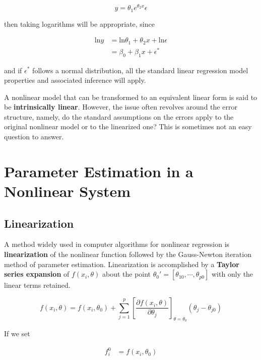 \documentclass[12pt]{article}
\begin{document}
$$
y = \theta_1 e^{\theta_2 x} \epsilon
$$

then taking logarithms will be appropriate, since

$$
\begin{aligned}
\mathrm{ln} y &= \mathrm{ln}\theta_1 + \theta_2 x + \mathrm{ln} \epsilon \\
&= \beta_0 + \beta_1 x + \epsilon^\ast
\end{aligned}
$$

and if $\epsilon^\ast$ follows a normal distribution, all the standard linear regression model properties and associated inference will apply.

A nonlinear model that can be transformed to an equivalent linear form is said to be \textbf{intrinsically linear}. However, the issue often revolves around the error structure, namely, do the standard assumptions on the errors apply to the original nonlinear model or to the linearized one? This is sometimes not an easy question to answer.


\section{Parameter Estimation in a Nonlinear System}

\subsection{Linearization}

A method widely used in computer algorithms for nonlinear regression is \textbf{linearization} of the nonlinear function followed by the Gauss-Newton iteration method of parameter estimation. Linearization is accomplished by a \textbf{Taylor series expansion} of $f(x_i, \theta)$ about the point $\theta_0' = [\theta_{10}, \cdots, \theta_{p0}]$ with only the linear terms retained. 

$$
f(x_i, \theta) = f(x_i, \theta_0) + \sum_{j=1}^p \left[ \frac{\partial f(x_i, \theta)}{\partial \theta_j} \right]_{\theta = \theta_0} (\theta_j - \theta_{j0})
$$


If we set 

$$
\begin{aligned}
f_i^0 &= f(x_i, \theta_0) \\[8pt]
\end{aligned}
$$
\end{document}
